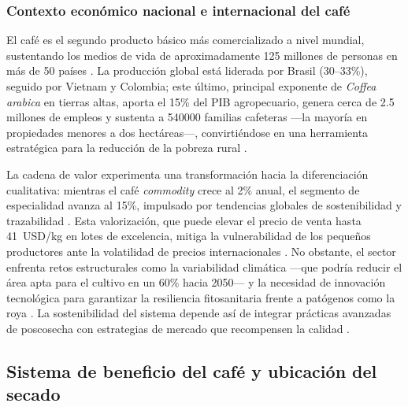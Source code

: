 \subsubsection{Contexto económico nacional e internacional del café}

El café es el segundo producto básico más comercializado a nivel mundial, sustentando 
los medios de vida de aproximadamente 125 millones de personas en más de 50 países 
\parencite{himri_comparative_2025, osorio_hernandez_computational_2020, 
lorencone_agricultural_2023, osorio_hernandez_simulation_2015}. La producción global 
está liderada por Brasil (30--33\%), seguido por Vietnam y Colombia; este último, 
principal exponente de \textit{Coffea arabica} en tierras altas, aporta el 15\% del 
PIB agropecuario, genera cerca de 2.5 millones de empleos y sustenta a 540000 
familias cafeteras —la mayoría en propiedades menores a dos hectáreas—, 
convirtiéndose en una herramienta estratégica para la reducción de la pobreza rural 
\parencite{lorencone_agricultural_2023, hasan_comparative_2024, tieghi_effects_2024, 
betancourt_agricultural_2024}.

La cadena de valor experimenta una transformación hacia la diferenciación cualitativa: 
mientras el café \textit{commodity} crece al 2\% anual, el segmento de especialidad 
avanza al 15\%, impulsado por tendencias globales de sostenibilidad y trazabilidad 
\parencite{barbosa_sensory_2019, febrianto_coffee_2023, tieghi_effects_2024}. Esta 
valorización, que puede elevar el precio de venta hasta 41~USD/kg en lotes de 
excelencia, mitiga la vulnerabilidad de los pequeños productores ante la volatilidad 
de precios internacionales \parencite{febrianto_coffee_2023, dias_alixandre_physical_2023, 
hasan_comparative_2024, tieghi_effects_2024}. No obstante, el sector enfrenta retos 
estructurales como la variabilidad climática —que podría reducir el área apta para 
el cultivo en un 60\% hacia 2050— y la necesidad de innovación tecnológica para 
garantizar la resiliencia fitosanitaria frente a patógenos como la roya 
\parencite{hasan_comparative_2024, lorencone_agricultural_2023, park_comparative_2025}. 
La sostenibilidad del sistema depende así de integrar prácticas avanzadas de 
poscosecha con estrategias de mercado que recompensen la calidad 
\parencite{dias_alixandre_physical_2023, betancourt_agricultural_2024}.

\subsection{Sistema de beneficio del café y ubicación del secado}

